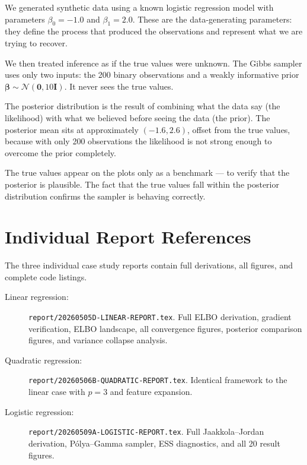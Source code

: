 \documentclass[11pt,a4paper]{article}
\newcommand{\N}{\mathcal{N}}
\begin{document}
\begin{framed}
\noindent
We generated synthetic data using a known logistic regression model with parameters
$\beta_0 = -1.0$ and $\beta_1 = 2.0$.
These are the data-generating parameters: they define the process that produced the
observations and represent what we are trying to recover.

We then treated inference as if the true values were unknown.
The Gibbs sampler uses only two inputs: the 200 binary observations and a weakly
informative prior $\bm{\beta} \sim \N(\bm{0}, 10\bm{I})$.
It never sees the true values.

The posterior distribution is the result of combining what the data say (the likelihood)
with what we believed before seeing the data (the prior).
The posterior mean sits at approximately $(-1.6, 2.6)$, offset from the true values,
because with only 200 observations the likelihood is not strong enough to overcome
the prior completely.

The true values appear on the plots only as a benchmark --- to verify that the posterior
is plausible.
The fact that the true values fall within the posterior distribution confirms the sampler
is behaving correctly.
\end{framed}

\section{Individual Report References}
\label{app:individual-refs}

The three individual case study reports contain full derivations, all figures, and
complete code listings.

\begin{description}
  \item[Linear regression:] \texttt{report/20260505D-LINEAR-REPORT.tex}.
    \label{app:linear-ref}
    Full ELBO derivation, gradient verification, ELBO landscape, all convergence
    figures, posterior comparison figures, and variance collapse analysis.
  \item[Quadratic regression:] \texttt{report/20260506B-QUADRATIC-REPORT.tex}.
    \label{app:quad-ref}
    Identical framework to the linear case with $p=3$ and feature expansion.
  \item[Logistic regression:] \texttt{report/20260509A-LOGISTIC-REPORT.tex}.
    \label{app:logistic-ref}
    Full Jaakkola--Jordan derivation, P\'{o}lya--Gamma sampler, ESS diagnostics,
    and all 20 result figures.
\end{description}
\end{document}
